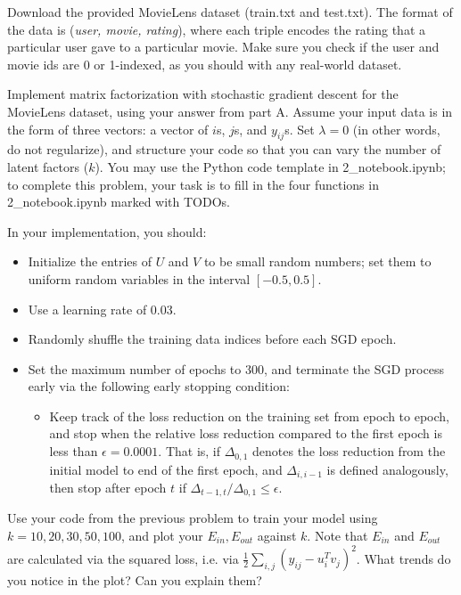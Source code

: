 \problem[10]
Download the provided MovieLens dataset (train.txt and test.txt).  The format of the data is (\emph{user, movie, rating}), where each triple encodes the rating that a particular user gave to a particular movie. Make sure you check if the user and movie ids are 0 or 1-indexed, as you should with any real-world dataset.

Implement matrix factorization with stochastic gradient descent for the MovieLens dataset, using your answer from part A. Assume your input data is in the form of three vectors: a vector of $i$s, $j$s, and $y_{ij}$s. Set $\lambda = 0$ (in other words, do not regularize), and structure your code so that you can vary the number of latent factors ($k$). You may use the Python code template in 2_notebook.ipynb; to complete this problem, your task is to fill in the four functions in 2_notebook.ipynb marked with TODOs.

In your implementation, you should:

\begin{itemize}
\item Initialize the entries of $U$ and $V$ to be small random numbers; set them to uniform random variables in the interval $[-0.5, 0.5]$.
\item Use a learning rate of 0.03.
\item Randomly shuffle the training data indices before each SGD epoch.
\item Set the maximum number of epochs to 300, and terminate the SGD process early via the following early stopping condition:
\begin{itemize}
\item Keep track of the loss reduction on the training set from epoch to epoch, and stop when the relative loss reduction compared to the first epoch is less than $\epsilon = 0.0001$.  That is, if $\Delta_{0,1}$ denotes the loss reduction from the initial model to end of the first epoch, and $\Delta_{i, i-1}$ is defined analogously, then stop after epoch $t$ if $\Delta_{t-1,t} / \Delta_{0,1} \leq \epsilon$.
\end{itemize}
\end{itemize}

\begin{solution}


\end{solution}

\problem[5]
Use your code from the previous problem to train your model using $k=10, 20, 30, 50, 100$, and plot your $E_{in}, E_{out}$ against $k$. Note that $E_{in}$ and $E_{out}$ are calculated via the squared loss, i.e. via $\frac{1}{2}\sum_{i,j} \left( y_{ij} - u_i^Tv_j\right)^2$. What trends do you notice in the plot? Can you explain them?

